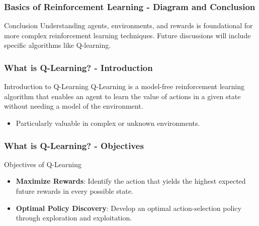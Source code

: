 \documentclass[aspectratio=169]{beamer}
\begin{document}
\begin{frame}[fragile]
    \frametitle{Basics of Reinforcement Learning - Diagram and Conclusion}

    \begin{block}{Conclusion}
        Understanding agents, environments, and rewards is foundational for more complex reinforcement learning techniques. Future discussions will include specific algorithms like Q-learning.
    \end{block}
\end{frame}

\begin{frame}[fragile]
    \frametitle{What is Q-Learning? - Introduction}
    \begin{block}{Introduction to Q-Learning}
        Q-Learning is a model-free reinforcement learning algorithm that enables an agent to learn the value of actions in a given state without needing a model of the environment. 
    \end{block}
    \begin{itemize}
        \item Particularly valuable in complex or unknown environments.
    \end{itemize}
\end{frame}

\begin{frame}[fragile]
    \frametitle{What is Q-Learning? - Objectives}
    \begin{block}{Objectives of Q-Learning}
        \begin{itemize}
            \item \textbf{Maximize Rewards}: Identify the action that yields the highest expected future rewards in every possible state.
            \item \textbf{Optimal Policy Discovery}: Develop an optimal action-selection policy through exploration and exploitation.
        \end{itemize}
    \end{block}
\end{frame}
\end{document}
